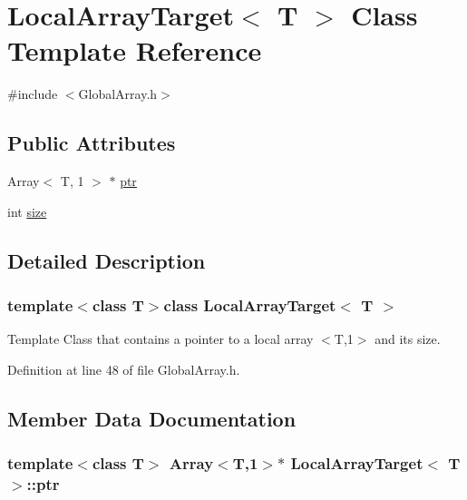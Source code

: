 \hypertarget{class_local_array_target}{\section{\-Local\-Array\-Target$<$ \-T $>$ \-Class \-Template \-Reference}
\label{class_local_array_target}
}


{\ttfamily \#include $<$\-Global\-Array.\-h$>$}

\subsection*{\-Public \-Attributes}
\begin{DoxyCompactItemize}
\item 
\-Array$<$ \-T, 1 $>$ $\ast$ \hyperlink{class_local_array_target_a3b29598eb841c0a02f411ab264d004c5}{ptr}
\item 
int \hyperlink{class_local_array_target_a86568f7d95eb26314a5856799071dc2e}{size}
\end{DoxyCompactItemize}


\subsection{\-Detailed \-Description}
\subsubsection*{template$<$class \-T$>$class Local\-Array\-Target$<$ T $>$}

\-Template \-Class that contains a pointer to a local array $<$\-T,1$>$ and its size. 

\-Definition at line 48 of file \-Global\-Array.\-h.



\subsection{\-Member \-Data \-Documentation}
\hypertarget{class_local_array_target_a3b29598eb841c0a02f411ab264d004c5}{
\subsubsection[{ptr}]{\setlength{\rightskip}{0pt plus 5cm}template$<$class \-T$>$ \-Array$<$\-T,1$>$$\ast$ {\bf \-Local\-Array\-Target}$<$ \-T $>$\-::{\bf ptr}}}\label{class_local_array_target_a3b29598eb841c0a02f411ab264d004c5}


